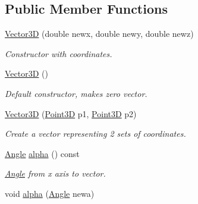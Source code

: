 \subsection*{Public Member Functions}
\begin{DoxyCompactItemize}
\item 
\hypertarget{class_vector3_d_a2d02adba0f730e11fc64f6c3088e961c}{\hyperlink{class_vector3_d_a2d02adba0f730e11fc64f6c3088e961c}{Vector3\+D} (double newx, double newy, double newz)}\label{class_vector3_d_a2d02adba0f730e11fc64f6c3088e961c}

\begin{DoxyCompactList}\small\item\em Constructor with coordinates. \end{DoxyCompactList}\item 
\hypertarget{class_vector3_d_a0b11a8d75da427b27443d8a94d0d296c}{\hyperlink{class_vector3_d_a0b11a8d75da427b27443d8a94d0d296c}{Vector3\+D} ()}\label{class_vector3_d_a0b11a8d75da427b27443d8a94d0d296c}

\begin{DoxyCompactList}\small\item\em Default constructor, makes zero vector. \end{DoxyCompactList}\item 
\hypertarget{class_vector3_d_ab0356b9f5bd4be1156bd533cc82ee1af}{\hyperlink{class_vector3_d_ab0356b9f5bd4be1156bd533cc82ee1af}{Vector3\+D} (\hyperlink{class_point3_d}{Point3\+D} p1, \hyperlink{class_point3_d}{Point3\+D} p2)}\label{class_vector3_d_ab0356b9f5bd4be1156bd533cc82ee1af}

\begin{DoxyCompactList}\small\item\em Create a vector representing 2 sets of coordinates. \end{DoxyCompactList}\item 
\hypertarget{class_vector3_d_a84165b911b5ae2c281a95d1bd60ecc4a}{\hyperlink{class_angle}{Angle} \hyperlink{class_vector3_d_a84165b911b5ae2c281a95d1bd60ecc4a}{alpha} () const }\label{class_vector3_d_a84165b911b5ae2c281a95d1bd60ecc4a}

\begin{DoxyCompactList}\small\item\em \hyperlink{class_angle}{Angle} from x axis to vector. \end{DoxyCompactList}\item 
\hypertarget{class_vector3_d_ae6572e98df6b70b759c85c87031bd9ed}{void \hyperlink{class_vector3_d_ae6572e98df6b70b759c85c87031bd9ed}{alpha} (\hyperlink{class_angle}{Angle} newa)}\label{class_vector3_d_ae6572e98df6b70b759c85c87031bd9ed}


\end{DoxyCompactItemize}
